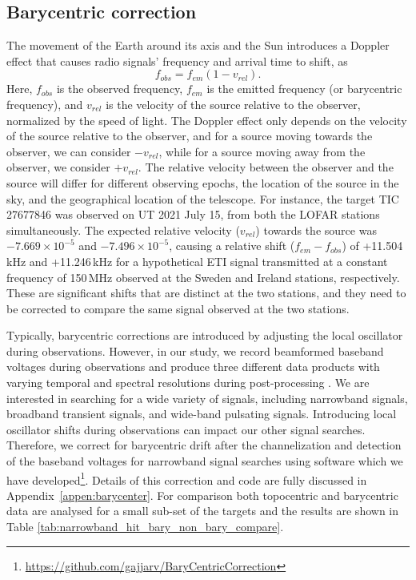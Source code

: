 \subsection{Barycentric correction}
The movement of the Earth around its axis and the Sun introduces a Doppler effect that causes radio signals' frequency and arrival time to shift, as 
\begin{equation}
f_{obs} = f_{em} \left( 1 - v_{rel} \right).
\label{eq:doppler}
\end{equation}
Here, $f_{obs}$ is the observed frequency, $f_{em}$ is the emitted frequency (or barycentric frequency), and $v_{rel}$ is the velocity of the source relative to the observer, normalized by the speed of light. The Doppler effect only depends on the velocity of the source relative to the observer, and for a source moving towards the observer, we can consider $-v_{rel}$, while for a source moving away from the observer, we consider $+v_{rel}$. The relative velocity between the observer and the source will differ for different observing epochs, the location of the source in the sky, and the geographical location of the telescope. For instance, the target TIC\,27677846 was observed on UT 2021 July 15, from both the LOFAR stations simultaneously. The expected relative velocity ($v_{rel}$) towards the source was $-7.669\times10^{-5}$ and $-7.496\times10^{-5}$, causing a relative shift ($f_{em}-f_{obs}$) of +11.504\,kHz and +11.246\,kHz for a hypothetical ETI signal transmitted at a constant frequency of 150\,MHz observed at the Sweden and Ireland stations, respectively. These are significant shifts that are distinct at the two stations, and they need to be corrected to compare the same signal observed at the two stations. 

Typically, barycentric corrections are introduced by adjusting the local oscillator during observations. However, in our study, we record beamformed baseband voltages during observations and produce three different data products with varying temporal and spectral resolutions during post-processing \citep{2019_Lebofsky}. We are interested in searching for a wide variety of signals, including narrowband signals, broadband transient signals, and wide-band pulsating signals. Introducing local oscillator shifts during observations can impact our other signal searches. Therefore, we correct for barycentric drift after the channelization and detection of the baseband voltages for narrowband signal searches using software which we have developed\footnote{\url{https://github.com/gajjarv/BaryCentricCorrection}}. Details of this correction and code \citep{Vishal_Bary} are fully discussed in Appendix~\ref{appen:barycenter}. For comparison both topocentric and barycentric data are analysed for a small sub-set of the targets and the results are shown in Table \ref{tab:narrowband_hit_bary_non_bary_compare}. 


